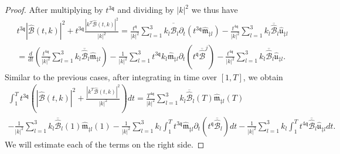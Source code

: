 \documentclass[10pt,a4paper]{amsart}
\newcommand{\qq}{\mathfrak{q}}
\newcommand{\tTq}{t^{3\qq}}
\newcommand{\tq}{t^{\qq}}
\begin{document}
\begin{proof}
After multiplying by $\tTq$ and dividing by $|k|^2$ we thus have
\begin{multline*}
 \tTq |\widehat{\mathcal{B}}(t,k)|^2 + \tTq \frac{|k^T\widehat{\mathcal{B}}(t,k)|^2}{|k|^2}
=
\frac{ \tq}{|k|^2}
\sum_{l=1}^3 
k_l\overline{\widehat{\mathcal{B}}}_l\partial_t\left( \tTq \widehat{\mathfrak{m}}_{\ddagger l} \right)
-
\frac{t^{4\qq} }{|k|^2}
\sum_{l=1}^3
k_l \overline{\widehat{\mathcal{B}}}_l \widehat{\mathfrak{u}}_{\ddagger l}
\\
=
\frac{d}{dt}\left(
\frac{ t^{4\qq}}{|k|^2}
\sum_{l=1}^3 
k_l\overline{\widehat{\mathcal{B}}}_l \widehat{\mathfrak{m}}_{\ddagger l} 
 \right)
 -
 \frac{1}{|k|^2 } 
 \sum_{l=1}^3 
  \tTq k_l\widehat{\mathfrak{m}}_{\ddagger l}\partial_t\left(\tq\overline{\widehat{\mathcal{B}}}^j\right) 
-
\frac{t^{4\qq} }{|k|^2}
\sum_{l=1}^3
k_l \overline{\widehat{\mathcal{B}}}_l \widehat{\mathfrak{u}}_{\ddagger l}.
\end{multline*}
Similar to the previous cases, after integrating in time over $[1,T]$, we obtain
\begin{multline*}
\int_1^{T} \tTq \left(  |\widehat{\mathcal{B}}(t,k)|^2 +  \frac{|k^T\widehat{\mathcal{B}}(t,k)|^2}{|k|^2}\right)  dt
=
 \frac{ T^{4\qq}}{|k|^2}
\sum_{l=1}^3 
k_l\overline{\widehat{\mathcal{B}}}_l(T) \widehat{\mathfrak{m}}_{\ddagger l} (T)
 \\
- \frac{ 1}{|k|^2}
\sum_{l=1}^3 
k_l\overline{\widehat{\mathcal{B}}}_l(1) \widehat{\mathfrak{m}}_{\ddagger l} (1)
  -
 \frac{1}{|k|^2 } 
 \sum_{l=1}^3 
   k_l \int_1^{T} \tTq \widehat{\mathfrak{m}}_{\ddagger l}\partial_t\left(\tq\overline{\widehat{\mathcal{B}}}_l\right)  dt
-
\frac{1 }{|k|^2}
\sum_{l=1}^3
k_l \int_1^{T}  t^{4\qq} \overline{\widehat{\mathcal{B}}}_l \widehat{\mathfrak{u}}_{\ddagger l} dt.
\end{multline*}
We will estimate each of the terms on the right side.


\end{proof}
\end{document}
